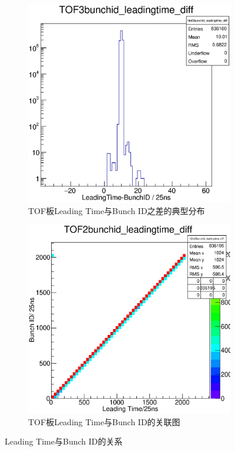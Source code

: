 \begin{figure}[htbp]
	\centering
	\begin{subfigure}[b]{0.48\textwidth}
        \includegraphics[width=\textwidth]{fig/tof_leadingtime_bunchid_diff.eps}
        \caption{TOF板Leading Time与Bunch ID之差的典型分布}
    \end{subfigure}
    \begin{subfigure}[b]{0.48\textwidth}
        \includegraphics[width=\textwidth]{fig/tof_leadingtime_vs_bunchid.eps}
        \caption{TOF板Leading Time与Bunch ID的关联图}
    \end{subfigure}
	\caption{Leading Time与Bunch ID的关系}
	\label{fig:tof_leadingtime_bunchid}
\end{figure}
